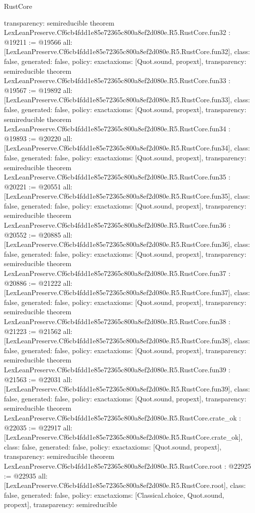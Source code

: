 \begin{lexlean}{RustCore}
\begin{coremodule}
{  transparency: semireducible
}
theorem LexLeanPreserve.Cf6cb4fdd1e85e72365c800a8ef2d080e.R5.RustCore.fun32 : @19211 := @19566 {
  all: [LexLeanPreserve.Cf6cb4fdd1e85e72365c800a8ef2d080e.R5.RustCore.fun32],
  class: false,
  generated: false,
  policy: exact{axioms: [Quot.sound, propext]},
  transparency: semireducible
}
theorem LexLeanPreserve.Cf6cb4fdd1e85e72365c800a8ef2d080e.R5.RustCore.fun33 : @19567 := @19892 {
  all: [LexLeanPreserve.Cf6cb4fdd1e85e72365c800a8ef2d080e.R5.RustCore.fun33],
  class: false,
  generated: false,
  policy: exact{axioms: [Quot.sound, propext]},
  transparency: semireducible
}
theorem LexLeanPreserve.Cf6cb4fdd1e85e72365c800a8ef2d080e.R5.RustCore.fun34 : @19893 := @20220 {
  all: [LexLeanPreserve.Cf6cb4fdd1e85e72365c800a8ef2d080e.R5.RustCore.fun34],
  class: false,
  generated: false,
  policy: exact{axioms: [Quot.sound, propext]},
  transparency: semireducible
}
theorem LexLeanPreserve.Cf6cb4fdd1e85e72365c800a8ef2d080e.R5.RustCore.fun35 : @20221 := @20551 {
  all: [LexLeanPreserve.Cf6cb4fdd1e85e72365c800a8ef2d080e.R5.RustCore.fun35],
  class: false,
  generated: false,
  policy: exact{axioms: [Quot.sound, propext]},
  transparency: semireducible
}
theorem LexLeanPreserve.Cf6cb4fdd1e85e72365c800a8ef2d080e.R5.RustCore.fun36 : @20552 := @20885 {
  all: [LexLeanPreserve.Cf6cb4fdd1e85e72365c800a8ef2d080e.R5.RustCore.fun36],
  class: false,
  generated: false,
  policy: exact{axioms: [Quot.sound, propext]},
  transparency: semireducible
}
theorem LexLeanPreserve.Cf6cb4fdd1e85e72365c800a8ef2d080e.R5.RustCore.fun37 : @20886 := @21222 {
  all: [LexLeanPreserve.Cf6cb4fdd1e85e72365c800a8ef2d080e.R5.RustCore.fun37],
  class: false,
  generated: false,
  policy: exact{axioms: [Quot.sound, propext]},
  transparency: semireducible
}
theorem LexLeanPreserve.Cf6cb4fdd1e85e72365c800a8ef2d080e.R5.RustCore.fun38 : @21223 := @21562 {
  all: [LexLeanPreserve.Cf6cb4fdd1e85e72365c800a8ef2d080e.R5.RustCore.fun38],
  class: false,
  generated: false,
  policy: exact{axioms: [Quot.sound, propext]},
  transparency: semireducible
}
theorem LexLeanPreserve.Cf6cb4fdd1e85e72365c800a8ef2d080e.R5.RustCore.fun39 : @21563 := @22031 {
  all: [LexLeanPreserve.Cf6cb4fdd1e85e72365c800a8ef2d080e.R5.RustCore.fun39],
  class: false,
  generated: false,
  policy: exact{axioms: [Quot.sound, propext]},
  transparency: semireducible
}
theorem LexLeanPreserve.Cf6cb4fdd1e85e72365c800a8ef2d080e.R5.RustCore.crate_ok : @22035 := @22917 {
  all: [LexLeanPreserve.Cf6cb4fdd1e85e72365c800a8ef2d080e.R5.RustCore.crate_ok],
  class: false,
  generated: false,
  policy: exact{axioms: [Quot.sound, propext]},
  transparency: semireducible
}
theorem LexLeanPreserve.Cf6cb4fdd1e85e72365c800a8ef2d080e.R5.RustCore.root : @22925 := @22935 {
  all: [LexLeanPreserve.Cf6cb4fdd1e85e72365c800a8ef2d080e.R5.RustCore.root],
  class: false,
  generated: false,
  policy: exact{axioms: [Classical.choice, Quot.sound, propext]},
  transparency: semireducible
}


\end{coremodule}
\end{lexlean}
